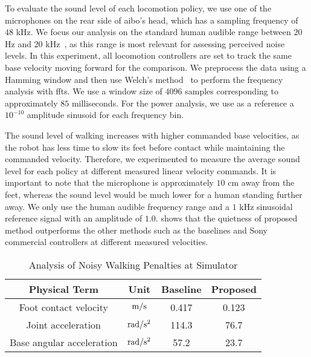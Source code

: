 To evaluate the sound level of each locomotion policy, we use one of the microphones on the rear side of aibo's head, which has a sampling frequency of $48$ kHz. We focus our analysis on the standard human audible range between $20$ Hz and $20$ kHz~\cite{neuroscience}, as this range is most relevant for assessing perceived noise levels. In this experiment, all locomotion controllers are set to track the same base velocity moving forward for the comparison. We preprocess the data using a Hamming window and then use Welch's method~\cite{welch1967use} to perform the frequency analysis with \acp{fft}. We use a window size of $4096$ samples corresponding to approximately $85$ milliseconds. For the power analysis, we use as a reference a $10^{-10}$ amplitude sinusoid for each frequency bin.

The sound level of walking increases with higher commanded base velocities, as the robot has less time to slow its feet before contact while maintaining the commanded velocity. Therefore, we experimented to measure the average sound level for each policy at different measured linear velocity commands. It is important to note that the microphone is approximately $10$ cm away from the feet, whereas the sound level would be much lower for a human standing further away. We only use the human audible frequency range and a $1$ kHz sinusoidal reference signal with an amplitude of $1.0$.  shows that the quietness of proposed method outperforms the other methods such as the baselines and Sony commercial controllers at different measured velocities. 

\begin{table}[!t]
\caption{Analysis of Noisy Walking Penalties at Simulator}
\label{table:reward_analysis}
\begin{center}
\begin{tabular}{cccc}
\toprule
\textbf{Physical Term} & \textbf{Unit} & \textbf{Baseline} & \textbf{Proposed} \\
\midrule
Foot contact velocity & $\rm{m/s}$ & 0.417 & 0.123 \\
Joint acceleration & $\rm{rad/s^2}$ & 114.3 & 76.7 \\
Base angular acceleration & $\rm{rad/s^2}$ & 57.2 & 23.7\\
\bottomrule
\end{tabular}
\end{center}
\end{table}


